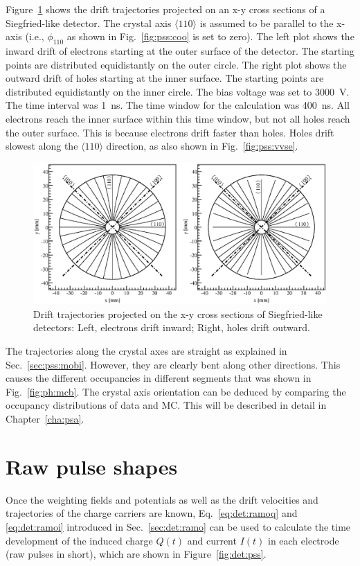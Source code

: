 Figure~\ref{fig:pss:trjs} shows the drift trajectories projected on an
x-y cross sections of a Siegfried-like detector. The crystal axis
$\langle 110 \rangle$ is assumed to be parallel to the x-axis
(i.e., $\phi_{110}$ as shown in Fig.~\ref{fig:pss:coo} is set
to zero). The left plot shows the inward drift of electrons starting
at the outer surface of the detector. The starting points are
distributed equidistantly on the outer circle.  The right plot shows
the outward drift of holes starting at the inner surface.  The
starting points are distributed equidistantly on the inner circle.
The bias voltage was set to 3000~V. The time interval was 1~ns.  The
time window for the calculation was 400~ns.  All electrons reach the
inner surface within this time window, but not all holes reach the
outer surface.  This is because electrons drift faster than holes.
Holes drift slowest along the $\langle 110 \rangle$ direction, as also
shown in Fig.~\ref{fig:pss:vvse}.
\begin{figure}[tbhp] 
\centering 
\includegraphics[width=\textwidth]{trjs} 
\caption{Drift trajectories projected on the x-y cross sections of
Siegfried-like detectors: Left, electrons drift inward; Right, holes
drift outward.}
\label{fig:pss:trjs} 
\end{figure} 
 
The trajectories along the crystal axes are straight as explained in
Sec.~\ref{sec:pss:mobi}.  However, they are clearly bent along other
directions.  This causes the different occupancies in different
segments that was shown in Fig.~\ref{fig:ph:mcb}.  The crystal axis
orientation can be deduced by comparing the occupancy distributions of
data and MC.  This will be described in detail in
Chapter~\ref{cha:psa}.
 
 
\section{Raw pulse shapes} 
\label{sec:pss:ps} 
Once the weighting fields and potentials as well as the drift
velocities and trajectories of the charge carriers are known,
Eq.~\ref{eq:det:ramoq} and \ref{eq:det:ramoi} introduced in
Sec.~\ref{sec:det:ramo} can be used to calculate the time development
of the induced charge $Q(t)$ and current $I(t)$ in each electrode (raw
pulses in short), which are shown in Figure~\ref{fig:det:pss}.

